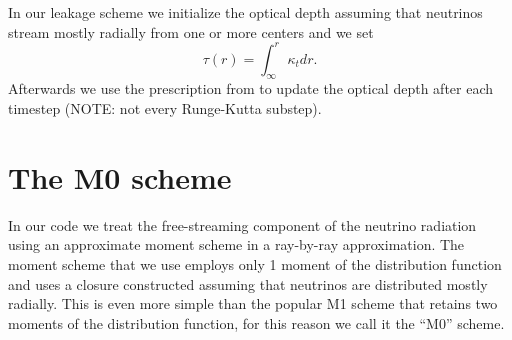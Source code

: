 In our leakage scheme we initialize the optical depth assuming that neutrinos
stream mostly radially from one or more centers and we set
\begin{equation}
  \tau(r) = \int_\infty^r \kappa_t dr.
\end{equation}
Afterwards we use the prescription from \cite{THCode_THCLeakageM0_Neilsen2014}
to update the optical depth after each timestep (NOTE: not every Runge-Kutta
substep).

\section{The M0 scheme}
In our code we treat the free-streaming component of the neutrino radiation
using an approximate moment scheme in a ray-by-ray approximation. The moment
scheme that we use employs only 1 moment of the distribution function and uses a
closure constructed assuming that neutrinos are distributed mostly radially.
This is even more simple than the popular M1 scheme that retains two moments of
the distribution function, for this reason we call it the ``M0'' scheme.

